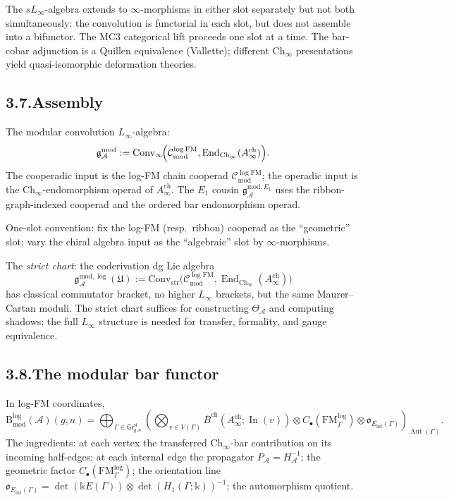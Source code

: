 \documentclass[11pt,reqno]{amsart}
\theoremstyle{definition}
\theoremstyle{remark}
\providecommand{\cA}{\mathcal{A}}
\providecommand{\cC}{\mathcal{C}}
\providecommand{\Bbbk}{\mathbb{k}}
\providecommand{\Convinf}{\mathrm{Conv}_\infty}
\providecommand{\Convstr}{\mathrm{Conv}_{\mathrm{str}}}
\providecommand{\orline}[1]{\mathfrak{o}_{#1}}
\numberwithin{equation}{section}
\begin{document}
The $sL_\infty$-algebra extends to $\infty$-morphisms in either slot
separately but not both simultaneously: the convolution is
functorial in each slot, but does not assemble into a bifunctor. The
MC3 categorical lift proceeds one slot at a time. The bar-cobar
adjunction is a Quillen equivalence (Vallette); different
$\mathrm{Ch}_\infty$ presentations yield quasi-isomorphic
deformation theories.

\subsection*{3.7.\enspace Assembly}

The modular convolution $L_\infty$-algebra:
\begin{equation}\label{eq:pref-convolution}
\mathfrak g^{\mathrm{mod}}_\cA:=\Convinf\!\Bigl(\cC^{\log\mathrm{FM}}_{\mathrm{mod}},\operatorname{End}_{\mathrm{Ch}_\infty}(A^{\mathrm{ch}}_\infty)\Bigr).
\end{equation}
The cooperadic input is the log-FM chain cooperad
$\cC^{\log\mathrm{FM}}_{\mathrm{mod}}$; the operadic input is the
$\mathrm{Ch}_\infty$-endomorphism operad of
$A^{\mathrm{ch}}_\infty$. The $E_1$ cousin
$\mathfrak g^{\mathrm{mod},E_1}_\cA$ uses the ribbon-graph-indexed
cooperad and the ordered bar endomorphism operad.

One-slot convention: fix the log-FM (resp.\ ribbon) cooperad as the
``geometric'' slot; vary the chiral algebra input as the ``algebraic''
slot by $\infty$-morphisms.

The \emph{strict chart}: the coderivation dg Lie algebra
\[
\mathfrak g^{\mathrm{mod},\log}_\cA(\mathfrak U):=\Convstr\!\bigl(\cC^{\log\mathrm{FM}}_{\mathrm{mod}},\operatorname{End}_{\mathrm{Ch}_\infty}(A^{\mathrm{ch}}_\infty)\bigr)
\]
has classical commutator bracket, no higher $L_\infty$ brackets, but
the same Maurer--Cartan moduli. The strict chart suffices for
constructing $\Theta_\cA$ and computing shadows; the full $L_\infty$
structure is needed for transfer, formality, and gauge equivalence.

\subsection*{3.8.\enspace The modular bar functor}

In log-FM coordinates,
\[
\mathrm B^{\log}_{\mathrm{mod}}(\cA)(g,n)=\bigoplus_{\Gamma\in\mathsf{Gr}^{\mathrm{st}}_{g,n}}\left(\bigotimes_{v\in V(\Gamma)}\bar B^{\mathrm{ch}}(A^{\mathrm{ch}}_\infty;\operatorname{In}(v))\otimes C_\bullet(\mathrm{FM}^{\log}_\Gamma)\otimes\orline{E_{\mathrm{int}}(\Gamma)}\right)_{\!\operatorname{Aut}(\Gamma)}.
\]
The ingredients: at each vertex the transferred
$\mathrm{Ch}_\infty$-bar contribution on its incoming half-edges;
at each internal edge the propagator $P_\cA=H_\cA^{-1}$; the geometric
factor $C_\bullet(\mathrm{FM}^{\log}_\Gamma)$; the orientation line
$\orline{E_{\mathrm{int}}(\Gamma)}=\det(\Bbbk E(\Gamma))\otimes\det(H_1(\Gamma;\Bbbk))^{-1}$;
the automorphism quotient.
\end{document}
